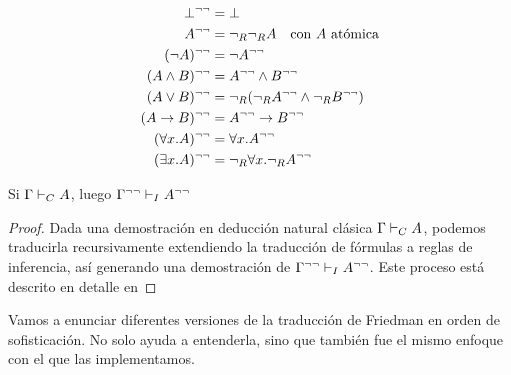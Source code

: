 \begin{definition}
    \begin{align*}
        \bot^{\neg\neg} &= \bot\\
        A^{\neg\neg} &= \neg_R\neg_R A
            \quad \text{con $A$ atómica}\\
        (\neg A)^{\neg\neg} &= \neg A^{\neg\neg}\\
        (A \wedge B)^{\neg\neg} &= A^{\neg\neg} \wedge B^{\neg\neg}\\
        (A \vee B)^{\neg\neg} &= \neg_R(\neg_RA^{\neg\neg} \wedge \neg_RB^{\neg\neg})\\
        (A \rightarrow B)^{\neg\neg} &= A^{\neg\neg} \rightarrow B^{\neg\neg}\\
        (\forall x . A)^{\neg\neg} &= \forall x . A^{\neg\neg}\\
        (\exists x . A)^{\neg\neg} &= \neg_R \forall x . \neg_R A^{\neg\neg}
    \end{align*}
\end{definition}

\begin{theorem}
    \label{fri:thm:dneg-trans-classic-int}
    Si $\Gamma \vdash_C A$, luego $\Gamma^{\neg\neg} \vdash_I A^{\neg\neg}$
\end{theorem}
\begin{proof}
    Dada una demostración en deducción natural clásica $\Gamma \vdash_C A$, podemos traducirla recursivamente extendiendo la traducción de fórmulas a reglas de inferencia, así generando una demostración de $\Gamma^{\neg\neg} \vdash_I A^{\neg\neg}$.
    Este proceso está descrito en detalle en 
\end{proof}

Vamos a enunciar diferentes versiones de la traducción de Friedman en orden de sofisticación. No solo ayuda a entenderla, sino que también fue el mismo enfoque con el que las implementamos.

